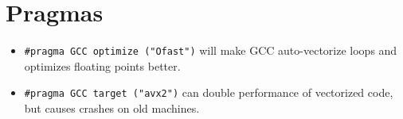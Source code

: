 \section{Pragmas}
	\begin{itemize}
		\item \lstinline{#pragma GCC optimize ("Ofast")} will make GCC auto-vectorize loops and optimizes floating points better.
		\item \lstinline{#pragma GCC target ("avx2")} can double performance of vectorized code, but causes crashes on old machines.
	\end{itemize}
